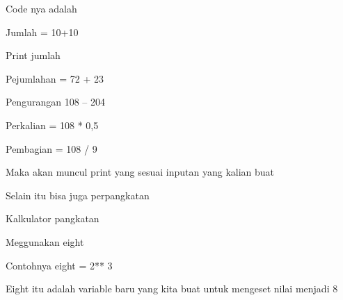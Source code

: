 \documentclass[a4paper,12pt]{report}
\begin{document}
\vspace{14pt}
\noindent 
{\fontsize{14pt}{14pt}\selectfont Code nya adalah  \\} \par
\vspace{14pt}
\vspace{14pt}
\noindent 
{\fontsize{14pt}{14pt}\selectfont Jumlah = 10+10 \\} \par
\noindent 
{\fontsize{14pt}{14pt}\selectfont Print jumlah \\} \par
\vspace{14pt}
\noindent 
{\fontsize{14pt}{14pt}\selectfont Pejumlahan = 72 + 23 \\} \par
\noindent 
{\fontsize{14pt}{14pt}\selectfont Pengurangan 108 – 204 \\} \par
\noindent 
{\fontsize{14pt}{14pt}\selectfont Perkalian = 108 * 0,5 \\} \par
\noindent 
{\fontsize{14pt}{14pt}\selectfont Pembagian = 108 / 9 \\} \par
\vspace{14pt}
\noindent 
{\fontsize{14pt}{14pt}\selectfont Maka akan muncul print yang sesuai inputan yang kalian buat \\} \par
\vspace{14pt}
\noindent 
{\fontsize{14pt}{14pt}\selectfont Selain itu bisa juga perpangkatan  \\} \par
\noindent 
{\fontsize{14pt}{14pt}\selectfont Kalkulator pangkatan \\} \par
\noindent 
{\fontsize{14pt}{14pt}\selectfont Meggunakan eight \\} \par
\vspace{14pt}
\noindent 
{\fontsize{14pt}{14pt}\selectfont Contohnya eight = 2** 3 \\} \par
\vspace{14pt}
\noindent 
{\fontsize{14pt}{14pt}\selectfont Eight itu adalah variable baru yang kita buat untuk mengeset nilai menjadi 8 \\} \par
\vspace{14pt}
\noindent 
\end{document}
